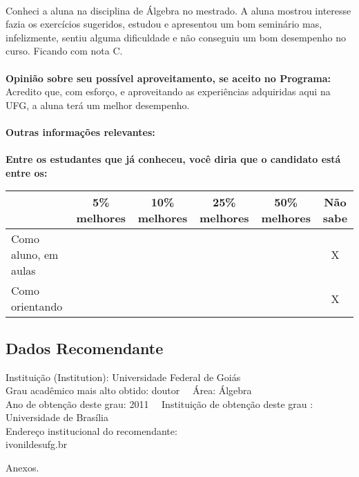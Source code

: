 \documentclass[11pt]{article}
\begin{document}
\\Conheci a aluna na disciplina de Álgebra no mestrado. A aluna mostrou interesse fazia os exercícios sugeridos, estudou e apresentou um bom seminário mas, infelizmente, sentiu alguma dificuldade e não conseguiu um bom desempenho no curso. Ficando com nota C.\\
\\
\textbf{Opinião sobre seu possível aproveitamento, se aceito no Programa:}
\\Acredito que, com esforço, e aproveitando as experiências adquiridas aqui na UFG, a aluna terá um melhor desempenho.\\ 
\\
\textbf{Outras informações relevantes:} \\
\\[0.3cm]
\textbf{Entre os estudantes que já conheceu, você diria que o candidato está entre os:}
\\
\begin{tabular}{|l|c|c|c|c|c|}
\hline
 & 5\% melhores & 10\% melhores & 25\% melhores & 50\% melhores & Não sabe \\
\hline
Como aluno, em aulas &  &  &  &  & X\\
\hline
Como orientando &  &  &  &  & X\\
\hline
\end{tabular}
\subsection*{Dados Recomendante} 
	Instituição (Institution): Universidade Federal de Goiás
\\ 
	Grau acadêmico mais alto obtido: doutor
	\ \ Área: Álgebra
	\\
	Ano de obtenção deste grau: 2011
	\ \ 
	Instituição de obtenção deste grau : Universidade de Brasília
	\\ 
	Endereço institucional do recomendante: \\ ivonildesufg.br 
\begin{center}
Anexos.
\end{center}
\end{document}
